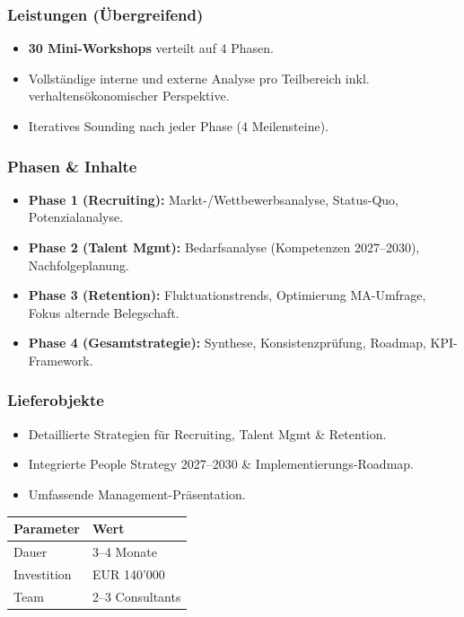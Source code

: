 \documentclass[11pt,a4paper]{article}
\begin{document}
\subsubsection*{Leistungen (Übergreifend)}
\begin{itemize}
    \item \textbf{30 Mini-Workshops} verteilt auf 4 Phasen.
    \item Vollständige interne und externe Analyse pro Teilbereich inkl. verhaltensökonomischer Perspektive.
    \item Iteratives Sounding nach jeder Phase (4 Meilensteine).
\end{itemize}

\subsubsection*{Phasen \& Inhalte}
\begin{itemize}
    \item \textbf{Phase 1 (Recruiting):} Markt-/Wettbewerbsanalyse, Status-Quo, Potenzialanalyse.
    \item \textbf{Phase 2 (Talent Mgmt):} Bedarfsanalyse (Kompetenzen 2027--2030), Nachfolgeplanung.
    \item \textbf{Phase 3 (Retention):} Fluktuationstrends, Optimierung MA-Umfrage, Fokus alternde Belegschaft.
    \item \textbf{Phase 4 (Gesamtstrategie):} Synthese, Konsistenzprüfung, Roadmap, KPI-Framework.
\end{itemize}

\subsubsection*{Lieferobjekte}
\begin{itemize}
    \item Detaillierte Strategien für Recruiting, Talent Mgmt \& Retention.
    \item Integrierte People Strategy 2027--2030 \& Implementierungs-Roadmap.
    \item Umfassende Management-Präsentation.
\end{itemize}

\begin{table}[h]
\centering
\begin{tabular}{ll}
\toprule
\textbf{Parameter} & \textbf{Wert} \\
\midrule
Dauer & 3--4 Monate \\
Investition & EUR 140'000 \\
Team & 2--3 Consultants \\
\bottomrule
\end{tabular}
\end{table}
\end{document}
